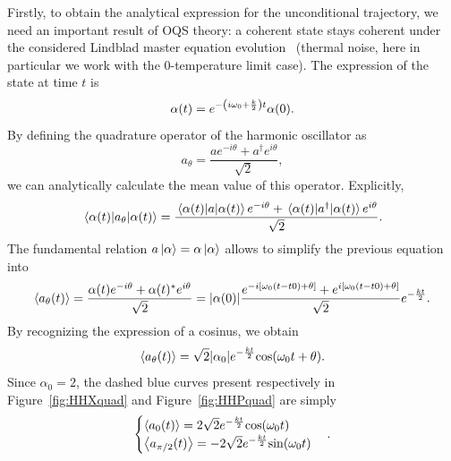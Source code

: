 Firstly, to obtain the analytical expression for the unconditional trajectory, we need an important result of OQS theory: a coherent state stays coherent under the considered Lindblad master equation evolution~\cite{Breuer} (thermal noise, here in particular we work with the 0-temperature limit case). The expression of the state at time $t$ is
\begin{equation}
    \alpha(t) = e^{-\qty(i\omega_0+\frac{k}{2}) t} \alpha(0).
\end{equation}
By defining the quadrature operator of the harmonic oscillator as
\begin{equation}
    a_\theta = \frac{ae^{-i\theta}+a^\dagger e^{i\theta}}{\sqrt{2}},
\end{equation}
we can analytically calculate the mean value of this operator. Explicitly,
\begin{equation}
    \expval{a_\theta}{\alpha(t)} =  \frac{\expval{a}{\alpha(t)}e^{-i\theta}+\expval{a^\dagger}{\alpha(t)} e^{i\theta}}{\sqrt{2}}.
\end{equation}
The fundamental relation $a\ket{\alpha}=\alpha\ket{\alpha}$ allows to simplify the previous equation into
\begin{equation}
    \expval{a_\theta(t)} = \frac{\alpha(t)e^{-i\theta}+\alpha(t)^* e^{i\theta}}{\sqrt{2}} = \abs{\alpha(0)}\frac{e^{-i\qty[\omega_0(t-t0)+\theta]}+e^{i\qty[\omega_0(t-t0)+\theta]}}{\sqrt{2}}e^{-\frac{k t}{2}}.
\end{equation}
By recognizing the expression of a cosinus, we obtain
\begin{equation}
    \expval{a_\theta(t)} = \sqrt{2}\abs{\alpha_0}e^{-\frac{k t}{2}}\mathrm{cos}\qty(\omega_0 t+\theta).
\end{equation}
Since $\alpha_0=2$, the dashed blue curves present respectively in Figure~\ref{fig:HHXquad} and Figure~\ref{fig:HHPquad} are simply
\begin{equation}
    \begin{cases}
        \expval{a_0(t)} = 2\sqrt{2}e^{-\frac{k t}{2}}\mathrm{cos}\qty(\omega_0 t)\\
        \expval{a_{\pi/2}(t)} = -2\sqrt{2}e^{-\frac{k t}{2}}\mathrm{sin}\qty(\omega_0 t)
    \end{cases}.
\end{equation}

